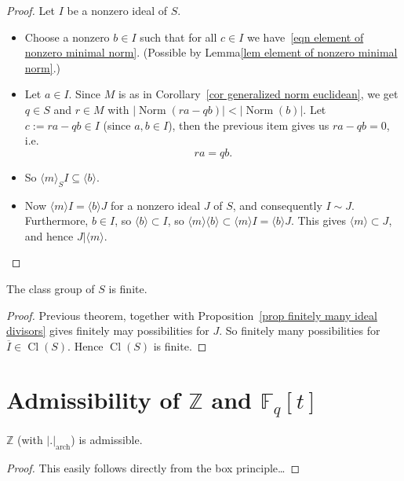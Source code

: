 \documentclass{amsart}
\newcommand{\Z}{\mathbb{Z}}
\newcommand{\F}{\mathbb{F}}
\newcommand{\NN}{\operatorname{Norm}}
\newcommand{\Cl}{\operatorname{Cl}}
\begin{document}
\begin{proof}
Let $I$ be a nonzero ideal of $S$.
\begin{itemize}
\item Choose a nonzero $b \in I$ such that for all $c \in I$ we have~\eqref{eqn element of nonzero minimal norm}.
(Possible by Lemma\ref{lem element of nonzero minimal norm}.)
\item Let $a \in I$. Since $M$ is as in Corollary~\ref{cor generalized norm euclidean}, we get $q \in S$ and $r \in M$ with $|\NN(r a-qb)| < |\NN(b)|$. Let $c:=ra-qb \in I$ (since $a,b \in I$), then the previous item gives us $ra-qb=0$, i.e.
\[ra=qb.\]
\item
So $\langle m \rangle_S I \subseteq \langle b \rangle$.
\item
Now $ \langle m \rangle I = \langle b \rangle J$ for a nonzero ideal $J$ of $S$, and consequently $I \sim J$. Furthermore, $b \in I$, so $ \langle b \rangle \subset I$, so $ \langle m \rangle \langle b \rangle \subset \langle m \rangle I = \langle b \rangle J$. This gives $\langle m \rangle \subset J$, and hence $J | \langle m \rangle$. 
\end{itemize}
\end{proof}

\begin{theorem}\label{thm class group finite admissible} 
The class group of $S$ is finite.
\end{theorem}

\begin{proof}
Previous theorem, together with Proposition~\ref{prop finitely many ideal divisors} gives finitely may possibilities for $J$. So finitely many possibilities for $\overline{I} \in \Cl(S)$. Hence $\Cl(S)$ is finite.
\end{proof}

\section{Admissibility of $\Z$ and $\F_q[t]$}

\begin{lemma}\label{lem Z admissible}
$\Z$ (with $|.|_{\text{arch}}$) is admissible.
\end{lemma}

\begin{proof}
This easily follows directly from the box principle\ldots
\end{proof}
\end{document}
